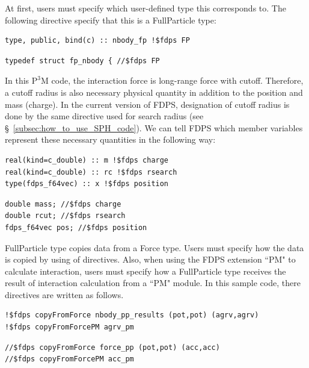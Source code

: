 \ifIF
At first, users must specify which user-defined type this \structure corresponds to. The following directive specify that this \structure is a \textsf{FullParticle} type:
\endifIF
\ifFtn
\begin{screen}
\begin{verbatim}
type, public, bind(c) :: nbody_fp !$fdps FP
\end{verbatim}
\end{screen}
\endifFtn
\ifC
\begin{screen}
\begin{verbatim}
typedef struct fp_nbody { //$fdps FP
\end{verbatim}
\end{screen}
\endifC
\ifIF
In this $\mathrm{P^{3}M}$ code, the interaction force is long-range force with cutoff. Therefore, a cutoff radius is also necessary physical quantity in addition to the position and mass (charge). In the current version of FDPS, designation of cutoff radius is done by the same directive used for search radius (see \S~\ref{subsec:how_to_use_SPH_code}). We can tell FDPS which member variables represent these necessary quantities in the following way:
\endifIF
\ifFtn
\begin{screen}
\begin{verbatim}
real(kind=c_double) :: m !$fdps charge
real(kind=c_double) :: rc !$fdps rsearch
type(fdps_f64vec) :: x !$fdps position
\end{verbatim}
\end{screen}
\endifFtn
\ifC
\begin{screen}
\begin{verbatim}
double mass; //$fdps charge
double rcut; //$fdps rsearch     
fdps_f64vec pos; //$fdps position
\end{verbatim}
\end{screen}
\endifC
\ifIF
\textsf{FullParticle} type copies data from a \textsf{Force} type. Users must specify how the data is copied by using of directives. Also, when using the FDPS extension ``PM" to calculate interaction, users must specify how a \textsf{FullParticle} type receives the result of interaction calculation from a ``PM" module. In this sample code, there directives are written as follows.
\endifIF
\ifFtn
\begin{screen}
\begin{verbatim}
!$fdps copyFromForce nbody_pp_results (pot,pot) (agrv,agrv)
!$fdps copyFromForcePM agrv_pm
\end{verbatim}
\end{screen}
\endifFtn
\ifC
\begin{screen}
\begin{verbatim}
//$fdps copyFromForce force_pp (pot,pot) (acc,acc)  
//$fdps copyFromForcePM acc_pm                      
\end{verbatim}
\end{screen}
\endifC


